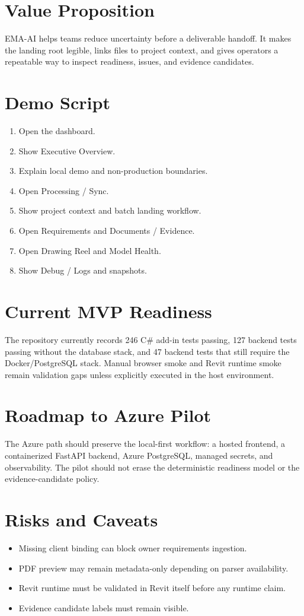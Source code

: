 \documentclass[11pt]{article}
\begin{document}
\section{Value Proposition}
EMA-AI helps teams reduce uncertainty before a deliverable handoff. It makes the landing root legible, links files to project context, and gives operators a repeatable way to inspect readiness, issues, and evidence candidates.

\section{Demo Script}
\begin{enumerate}[leftmargin=*]
\item Open the dashboard.
\item Show Executive Overview.
\item Explain local demo and non-production boundaries.
\item Open Processing / Sync.
\item Show project context and batch landing workflow.
\item Open Requirements and Documents / Evidence.
\item Open Drawing Reel and Model Health.
\item Show Debug / Logs and snapshots.
\end{enumerate}

\section{Current MVP Readiness}
The repository currently records 246 C\# add-in tests passing, 127 backend tests passing without the database stack, and 47 backend tests that still require the Docker/PostgreSQL stack. Manual browser smoke and Revit runtime smoke remain validation gaps unless explicitly executed in the host environment.

\section{Roadmap to Azure Pilot}
The Azure path should preserve the local-first workflow: a hosted frontend, a containerized FastAPI backend, Azure PostgreSQL, managed secrets, and observability. The pilot should not erase the deterministic readiness model or the evidence-candidate policy.

\section{Risks and Caveats}
\begin{itemize}[leftmargin=*]
\item Missing client binding can block owner requirements ingestion.
\item PDF preview may remain metadata-only depending on parser availability.
\item Revit runtime must be validated in Revit itself before any runtime claim.
\item Evidence candidate labels must remain visible.
\end{itemize}
\end{document}
